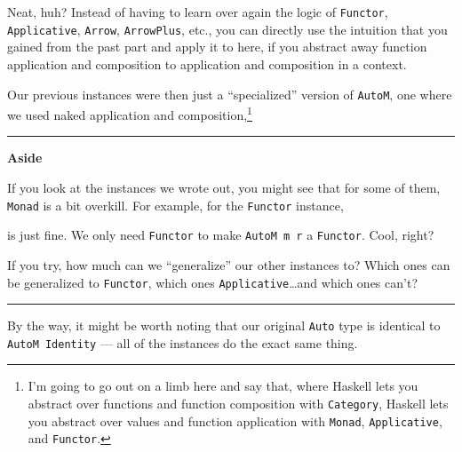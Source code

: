 \documentclass[]{article}
\newenvironment{Shaded}{}{}
\newcommand{\KeywordTok}[1]{\textcolor[rgb]{0.00,0.44,0.13}{\textbf{{#1}}}}
\newcommand{\DataTypeTok}[1]{\textcolor[rgb]{0.56,0.13,0.00}{{#1}}}
\newcommand{\OtherTok}[1]{\textcolor[rgb]{0.00,0.44,0.13}{{#1}}}
\newcommand{\FunctionTok}[1]{\textcolor[rgb]{0.02,0.16,0.49}{{#1}}}
\newcommand{\NormalTok}[1]{{#1}}
\begin{document}
Neat, huh? Instead of having to learn over again the logic of
\texttt{Functor}, \texttt{Applicative}, \texttt{Arrow},
\texttt{ArrowPlus}, etc., you can directly use the intuition that you
gained from the past part and apply it to here, if you abstract away
function application and composition to application and composition in a
context.

Our previous instances were then just a ``specialized'' version of
\texttt{AutoM}, one where we used naked application and
composition,\footnote{I'm going to go out on a limb here and say that,
  where Haskell lets you abstract over functions and function
  composition with \texttt{Category}, Haskell lets you abstract over
  values and function application with \texttt{Monad},
  \texttt{Applicative}, and \texttt{Functor}.}

\begin{center}\rule{0.5\linewidth}{\linethickness}\end{center}

\textbf{Aside}

If you look at the instances we wrote out, you might see that for some
of them, \texttt{Monad} is a bit overkill. For example, for the
\texttt{Functor} instance,

\begin{Shaded}
\end{Shaded}

is just fine. We only need \texttt{Functor} to make \texttt{AutoM\ m\ r}
a \texttt{Functor}. Cool, right?

If you try, how much can we ``generalize'' our other instances to? Which
ones can be generalized to \texttt{Functor}, which ones
\texttt{Applicative}\ldots{}and which ones can't?

\begin{center}\rule{0.5\linewidth}{\linethickness}\end{center}

By the way, it might be worth noting that our original \texttt{Auto}
type is identical to \texttt{AutoM\ Identity} --- all of the instances
do the exact same thing.
\end{document}
